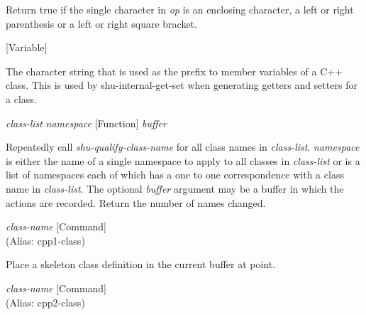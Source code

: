 \begin{doc-string}
Return true if the single character in \emph{op} is an enclosing character, a left
or right parenthesis or a left or right square bracket.
\end{doc-string}

\vspace{1em}
\noindent
{}
\usebox{\funcname}
 \hfill [Variable]

\begin{doc-string}
The character string that is used as the prefix to member variables of a C++ class.
This is used by shu-internal-get-set when generating getters and setters for a class.
\end{doc-string}

\vspace{1em}
\noindent
{}
\usebox{\funcname}\emph{class-list} \emph{namespace}
 \hfill [Function]
\hspace*{\wd\funcname}\emph{buffer}

\begin{doc-string}
Repeatedly call \emph{shu-qualify-class-name} for all class names in \emph{class-list}.
\emph{namespace} is either the name of a single namespace to apply to all classes
in \emph{class-list} or is a list of namespaces each of which has a one to one
correspondence with a class name in \emph{class-list}.  The optional \emph{buffer}
argument may be a buffer in which the actions are recorded.  Return the
number of names changed.
\end{doc-string}

\vspace{1em}
\noindent
{}
\usebox{\funcname}\emph{class-name}
 \hfill [Command]\\%
 (Alias: cpp1-class)

\begin{doc-string}
Place a skeleton class definition in the current buffer at point.
\end{doc-string}

\vspace{1em}
\noindent
{}
\usebox{\funcname}\emph{class-name}
 \hfill [Command]\\%
 (Alias: cpp2-class)

